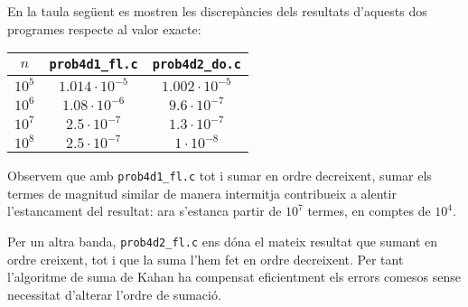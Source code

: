 \documentclass[12pt]{article}
\begin{document}
En la taula següent es mostren les discrepàncies dels resultats d'aquests dos programes respecte al valor exacte:
\begin{center}
	\begin{tabular}{c|c|c}

		\( n \)&\texttt{prob4d1\_fl.c}&\texttt{prob4d2\_do.c}\\
		\hline
		\hline
		$10^5 $&$1.014\cdot10^{-5}$&$1.002\cdot10^{-5}$\\
		\hline
		$10^6 $&$1.08\cdot10^{-6}$&$9.6\cdot10^{-7}$\\
		\hline
		$10^7 $&$2.5\cdot10^{-7}$&$1.3\cdot10^{-7}$\\
		\hline
		$10^8 $&$2.5\cdot10^{-7}$&$1\cdot10^{-8}$\\
		\hline
	\end{tabular}
\end{center}
Observem que amb \texttt{prob4d1\_fl.c} tot i sumar en ordre decreixent, sumar els termes de magnitud similar de manera intermitja contribueix a alentir l'estancament del resultat: ara s'estanca partir de $10^7$ termes, en comptes de $10^4$.

Per un altra banda, \texttt{prob4d2\_fl.c} ens dóna el mateix resultat que sumant en ordre creixent, tot i que la suma l'hem fet en ordre decreixent. Per tant l'algoritme de suma de Kahan ha compensat eficientment els errors comesos sense necessitat d'alterar l'ordre de sumació. 
\end{document}
